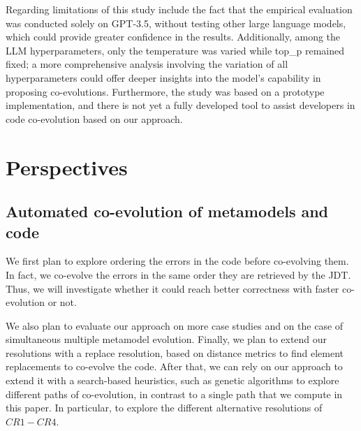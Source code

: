 Regarding limitations of this study include the fact that the empirical evaluation was conducted solely on GPT-3.5, without testing other large language models, which could provide greater confidence in the results. Additionally, among the LLM hyperparameters, only the temperature was varied while top\_p remained fixed; a more comprehensive analysis involving the variation of all hyperparameters could offer deeper insights into the model's capability in proposing co-evolutions. Furthermore, the study was based on a prototype implementation, and there is not yet a fully developed tool to assist developers in code co-evolution based on our approach.
\section{Perspectives}
\subsection{Automated co-evolution of metamodels and code}
We first plan to explore ordering the errors in the code before co-evolving them. In fact, we co-evolve the errors in the same order they are retrieved by the JDT. Thus, we will investigate whether it could reach better correctness with faster co-evolution or not. 

We also plan to evaluate our approach on more case studies and on the case of simultaneous multiple metamodel evolution. 
%
Finally, we plan to extend our resolutions with a replace resolution, based on distance metrics to find element replacements to co-evolve the code. After that, we can rely on our approach to extend it with a search-based heuristics, such as genetic algorithms to explore different paths of co-evolution, in contrast to a single path that we compute in this paper. In particular, to explore the different alternative resolutions of $CR1-CR4$. 

%
%

